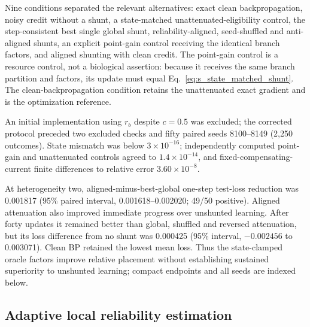 Nine conditions separated the relevant alternatives: exact clean
backpropagation, noisy credit without a shunt, a state-matched
unattenuated-eligibility control, the step-consistent best single global shunt,
reliability-aligned, seed-shuffled and anti-aligned shunts, an explicit
point-gain control receiving the identical branch factors, and aligned
shunting with clean credit. The point-gain control is a resource
control, not a biological assertion: because it receives the same branch
partition and factors, its update must equal Eq.~\ref{eq:s_state_matched_shunt}.
The clean-backpropagation condition retains the unattenuated exact gradient and
is the optimization reference.

An initial implementation using $r_b$ despite $c=0.5$ was excluded; the corrected protocol preceded two excluded checks and fifty paired seeds 8100--8149 (2,250 outcomes). State mismatch was below $3\times10^{-16}$; independently computed point-gain and unattenuated controls agreed to $1.4\times10^{-14}$, and fixed-compensating-current finite differences to relative error $3.60\times10^{-8}$.

At heterogeneity two, aligned-minus-best-global one-step test-loss reduction was 0.001817 (95\% paired interval, 0.001618--0.002020; 49/50 positive). Aligned attenuation also improved immediate progress over unshunted learning. After forty updates it remained better than global, shuffled and reversed attenuation, but its loss difference from no shunt was 0.000425 (95\% interval, $-0.002456$ to 0.003071). Clean BP retained the lowest mean loss. Thus the state-clamped oracle factors improve relative placement without establishing sustained superiority to unshunted learning; compact endpoints and all seeds are indexed below.

\subsection{Adaptive local reliability estimation}

